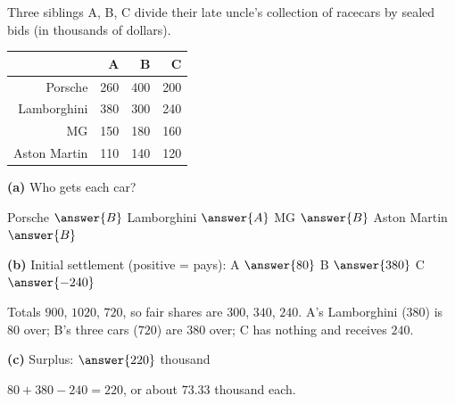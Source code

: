 \documentclass[12pt]{ximera}
\begin{document}
\begin{problem}
Three siblings A, B, C divide their late uncle's collection of racecars by sealed bids
(in thousands of dollars).
\begin{center}
\begin{tabular}{r|rrr}
 & A & B & C\\\hline
Porsche & 260 & 400 & 200\\
Lamborghini & 380 & 300 & 240\\
MG & 150 & 180 & 160\\
Aston Martin & 110 & 140 & 120
\end{tabular}
\end{center}

\begin{prompt}
\textbf{(a)} Who gets each car?

Porsche $\answer{B}$ \quad Lamborghini $\answer{A}$ \quad MG $\answer{B}$ \quad
Aston Martin $\answer{B}$
\end{prompt}

\begin{prompt}
\textbf{(b)} Initial settlement (positive = pays): A $\answer{80}$ \quad B $\answer{380}$ \quad
C $\answer{-240}$
\begin{feedback}
Totals $900$, $1020$, $720$, so fair shares are $300$, $340$, $240$. A's Lamborghini
($380$) is $80$ over; B's three cars ($720$) are $380$ over; C has nothing and receives
$240$.
\end{feedback}
\end{prompt}

\begin{prompt}
\textbf{(c)} Surplus: $\answer{220}$ thousand
\begin{feedback}
$80+380-240=220$, or about $73.33$ thousand each.
\end{feedback}
\end{prompt}
\end{problem}
\end{document}
